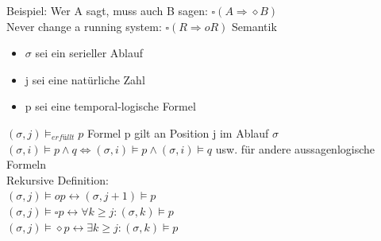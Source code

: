 Beispiel: Wer A sagt, muss auch B sagen: $\square(A \Rightarrow \diamond B)$ \\
Never change a running system: $\square(R \Rightarrow o R)$
Semantik
\begin{itemize}
	\item $\sigma$ sei ein serieller Ablauf
	\item j sei eine natürliche Zahl
	\item p sei eine temporal-logische Formel
\end{itemize}

$(\sigma, j) \models_{erfüllt} p$ Formel p gilt an Position j im Ablauf  $\sigma$\\
$(\sigma, i) \models p \land q \Leftrightarrow (\sigma, i) \models p \land (\sigma, i) \models q$ usw. für andere aussagenlogische Formeln\\
Rekursive Definition:\\
$(\sigma, j) \models o p \leftrightarrow (\sigma, j +1) \models p$\\
$(\sigma, j) \models \square p \leftrightarrow \forall k \geq j: (\sigma, k) \models p$\\
$(\sigma, j) \models \diamond p \leftrightarrow \exists k \geq j: (\sigma, k) \models p$

